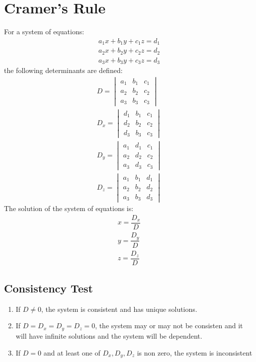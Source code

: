\section{Cramer's Rule}
For a system of equations:
\begin{align}
	a_1x+b_1y+c_1z=d_1\nonumber\\
	a_2x+b_2y+c_2z=d_2\nonumber\\
	a_3x+b_3y+c_3z=d_3\nonumber
\end{align}
the following determinants are defined:
\begin{align}
	D=\begin{vmatrix}a_1&b_1&c_1\\a_2&b_2&c_2\\a_3&b_3&c_3\end{vmatrix}\nonumber\\
	D_x=\begin{vmatrix}d_1&b_1&c_1\\d_2&b_2&c_2\\d_3&b_3&c_3\end{vmatrix}\nonumber\\
	D_y=\begin{vmatrix}a_1&d_1&c_1\\a_2&d_2&c_2\\a_3&d_3&c_3\end{vmatrix}\nonumber\\
	D_z=\begin{vmatrix}a_1&b_1&d_1\\a_2&b_2&d_2\\a_3&b_3&d_3\end{vmatrix}\nonumber
\end{align}
The solution of the system of equations is:
\begin{align}
	x=\dfrac{D_x}{D}\\
	y=\dfrac{D_y}{D}\\
	z=\dfrac{D_z}{D}
\end{align}
\subsection{Consistency Test}
\begin{enumerate}
	\item If $D\neq0$, the system is consistent and has unique solutions.
	\item If $D=D_x=D_y=D_z=0$, the system may or may not be consisten and it will have infinite solutions and the system will be dependent.
	\item If $D=0$ and at least one of $D_x, D_y, D_z$ is non zero, the system is inconsistent
\end{enumerate}
